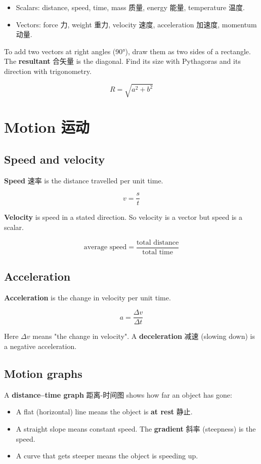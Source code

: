 \documentclass[11pt]{article}
\begin{document}
\begin{itemize}
\item Scalars: distance, speed, time, mass 质量, energy 能量, temperature 温度.

\item Vectors: force 力, weight 重力, velocity 速度, acceleration 加速度, momentum 动量.

\end{itemize}

To add two vectors at right angles (90°), draw them as two sides of a rectangle. The \textbf{resultant} 合矢量 is the diagonal. Find its size with Pythagoras and its direction with trigonometry.

\[
R = \sqrt{a^2 + b^2}
\]

\section*{Motion 运动}

\subsection*{Speed and velocity}

\textbf{Speed} 速率 is the distance travelled per unit time.

\[
v = \frac{s}{t}
\]

\textbf{Velocity} is speed in a stated direction. So velocity is a vector but speed is a scalar.

\[
\text{average speed} = \frac{\text{total distance}}{\text{total time}}
\]

\subsection*{Acceleration}

\textbf{Acceleration} is the change in velocity per unit time.

\[
a = \frac{\Delta v}{\Delta t}
\]

Here $\Delta v$ means "the change in velocity". A \textbf{deceleration} 减速 (slowing down) is a negative acceleration.

\subsection*{Motion graphs}

A \textbf{distance–time graph} 距离-时间图 shows how far an object has gone:

\begin{itemize}
\item A flat (horizontal) line means the object is \textbf{at rest} 静止.

\item A straight slope means constant speed. The \textbf{gradient} 斜率 (steepness) is the speed.

\item A curve that gets steeper means the object is speeding up.

\end{itemize}
\end{document}
